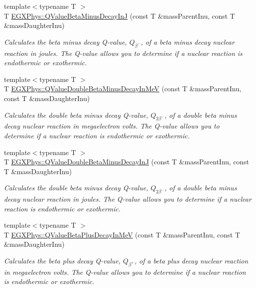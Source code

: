 \begin{DoxyCompactItemize}
{\footnotesize template$<$typename T $>$ }\\T \hyperlink{group___q_value_ga4a2ab24ffb317abc97ce46c92bb64c3c}{E\+G\+X\+Phys\+::\+Q\+Value\+Beta\+Minus\+Decay\+InJ} (const T \&mass\+Parent\+Inu, const T \&mass\+Daughter\+Inu)
\begin{DoxyCompactList}\small\item\em Calculates the beta minus decay Q-\/value, $Q_{\beta^-}$, of a beta minus decay nuclear reaction in joules. The Q-\/value allows you to determine if a nuclear reaction is endothermic or exothermic. \end{DoxyCompactList}\item 
{\footnotesize template$<$typename T $>$ }\\T \hyperlink{group___q_value_ga0eefdd84aa89d210e00dca043368dfeb}{E\+G\+X\+Phys\+::\+Q\+Value\+Double\+Beta\+Minus\+Decay\+In\+MeV} (const T \&mass\+Parent\+Inu, const T \&mass\+Daughter\+Inu)
\begin{DoxyCompactList}\small\item\em Calculates the double beta minus decay Q-\/value, $Q_{2\beta^-}$, of a double beta minus decay nuclear reaction in megaelectron volts. The Q-\/value allows you to determine if a nuclear reaction is endothermic or exothermic. \end{DoxyCompactList}\item 
{\footnotesize template$<$typename T $>$ }\\T \hyperlink{group___q_value_gaf19d189152aec04d8b1ebbbe8792540b}{E\+G\+X\+Phys\+::\+Q\+Value\+Double\+Beta\+Minus\+Decay\+InJ} (const T \&mass\+Parent\+Inu, const T \&mass\+Daughter\+Inu)
\begin{DoxyCompactList}\small\item\em Calculates the double beta minus decay Q-\/value, $Q_{2\beta^-}$, of a double beta minus decay nuclear reaction in joules. The Q-\/value allows you to determine if a nuclear reaction is endothermic or exothermic. \end{DoxyCompactList}\item 
{\footnotesize template$<$typename T $>$ }\\T \hyperlink{group___q_value_ga9bf549cd4f8e1c76e9cc41b72d4f0279}{E\+G\+X\+Phys\+::\+Q\+Value\+Beta\+Plus\+Decay\+In\+MeV} (const T \&mass\+Parent\+Inu, const T \&mass\+Daughter\+Inu)
\begin{DoxyCompactList}\small\item\em Calculates the beta plus decay Q-\/value, $Q_{\beta^+}$, of a beta plus decay nuclear reaction in megaelectron volts. The Q-\/value allows you to determine if a nuclear reaction is endothermic or exothermic. \end{DoxyCompactList}\item 

\end{DoxyCompactItemize}
